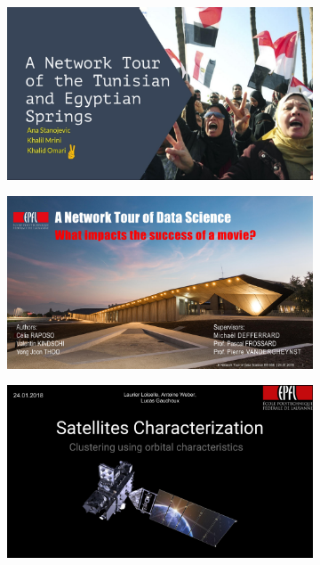 \documentclass[aspectratio=169]{beamer}
\begin{document}
\begin{frame}
\begin{figure}
\begin{subfigure}[b]{0.24\linewidth}
		\end{subfigure}
		\hfill
		\begin{subfigure}[b]{0.24\linewidth}
			\includegraphics[width=\linewidth]{project2017_springs}
		\end{subfigure}
		\hfill
		\begin{subfigure}[b]{0.24\linewidth}
			\includegraphics[width=\linewidth]{project2017_movies}
		\end{subfigure}
		\hfill
		\begin{subfigure}[b]{0.24\linewidth}
			\includegraphics[width=\linewidth]{project2017_satellites}
		\end{subfigure}
	\end{figure}
\end{frame}

\end{document}
